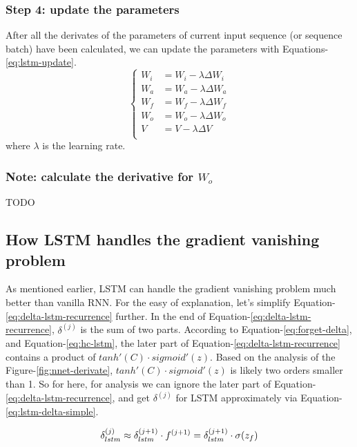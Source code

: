 \documentclass[english]{article}
\begin{document}
\subsubsection{Step 4: update the parameters} 
After all the derivates of the parameters of current input sequence (or sequence batch) have been calculated, we can update the parameters with Equations-\ref{eq:lstm-update}.
\begin{equation}\label{eq:lstm-update}\begin{cases}
W_i &= W_i  - \lambda \Delta W_i\\
W_a &= W_a  - \lambda \Delta W_a\\
W_f &= W_f  - \lambda \Delta W_f\\
W_o &= W_o  - \lambda \Delta W_o\\
V &= V - \lambda \Delta V\\
\end{cases}\end{equation}
where $\lambda$ is the learning rate. 

\subsubsection{Note:  calculate the derivative for $W_o$} 
TODO

\subsection{How LSTM handles the gradient vanishing problem}
As mentioned earlier, LSTM can handle the gradient vanishing problem much better than vanilla RNN.  For the easy of explanation, let's simplify
Equation-\ref{eq:delta-lstm-recurrence} further. In the end of Equation-\ref{eq:delta-lstm-recurrence},  $\delta^{(j)}$ is the sum of two parts.  According 
to Equation-\ref{eq:forget-delta}, and Equation-\ref{eq:hc-lstm}, the later part of Equation-\ref{eq:delta-lstm-recurrence} contains a product of $tanh'(C) \cdot sigmoid'(z)$. Based on the analysis of the Figure-\ref{fig:nnet-derivate}, $tanh'(C) \cdot sigmoid'(z)$ is likely two orders smaller than 1. 
So for here, for analysis we can ignore the later part of Equation-\ref{eq:delta-lstm-recurrence}, and get $\delta^{(j)}$ for LSTM approximately via 
Equation-\ref{eq:lstm-delta-simple}.

\begin{equation}\label{eq:lstm-delta-simple}
\delta^{(j)}_{lstm}  \approx \delta^{(j+1)}_{lstm} \cdot f^{(j+1)} = \delta^{(j+1)}_{lstm} \cdot \sigma(z_f) \\
\end{equation}
\end{document}
